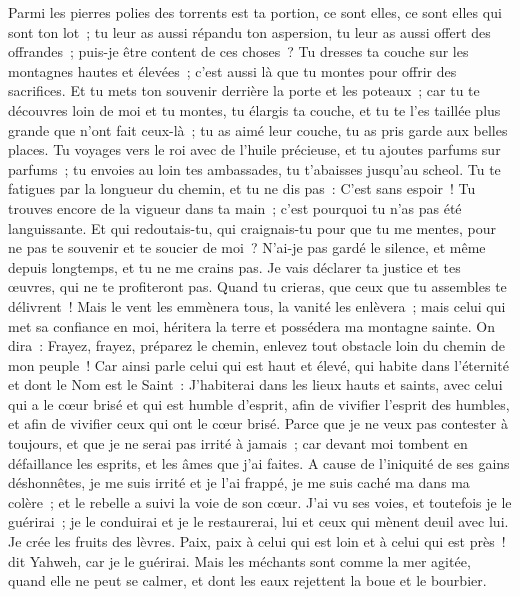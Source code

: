\begin{multicols}{2}
Parmi les pierres polies des torrents est ta portion, ce sont elles, ce sont elles qui sont ton lot~; tu leur as aussi répandu ton aspersion, tu leur as aussi offert des offrandes~; puis-je être content de ces choses~?
Tu dresses ta couche sur les montagnes hautes et élevées~; c'est aussi là que tu montes pour offrir des sacrifices.
Et tu mets ton souvenir derrière la porte et les poteaux~; car tu te découvres loin de moi et tu montes, tu élargis ta couche, et tu te l'es taillée plus grande que n'ont fait ceux-là~; tu as aimé leur couche, tu as pris garde aux belles places.
Tu voyages vers le roi avec de l'huile précieuse, et tu ajoutes parfums sur parfums~; tu envoies au loin tes ambassades, tu t'abaisses jusqu'au scheol.
Tu te fatigues par la longueur du chemin, et tu ne dis pas~: C'est sans espoir~! Tu trouves encore de la vigueur dans ta main~; c'est pourquoi tu n'as pas été languissante.
Et qui redoutais-tu, qui craignais-tu pour que tu me mentes, pour ne pas te souvenir et te soucier de moi~? N'ai-je pas gardé le silence, et même depuis longtemps, et tu ne me crains pas.
Je vais déclarer ta justice et tes œuvres, qui ne te profiteront pas.
Quand tu crieras, que ceux que tu assembles te délivrent~! Mais le vent les emmènera tous, la vanité les enlèvera~; mais celui qui met sa confiance en moi, héritera la terre et possédera ma montagne sainte.
On dira~: Frayez, frayez, préparez le chemin, enlevez tout obstacle loin du chemin de mon peuple~!
Car ainsi parle celui qui est haut et élevé, qui habite dans l'éternité et dont le Nom est le Saint~: J'habiterai dans les lieux hauts et saints, avec celui qui a le cœur brisé et qui est humble d'esprit, afin de vivifier l'esprit des humbles, et afin de vivifier ceux qui ont le cœur brisé.
Parce que je ne veux pas contester à toujours, et que je ne serai pas irrité à jamais~; car devant moi tombent en défaillance les esprits, et les âmes que j'ai faites.
A cause de l'iniquité de ses gains déshonnêtes, je me suis irrité et je l'ai frappé, je me suis caché ma dans ma colère~; et le rebelle a suivi la voie de son cœur.
J'ai vu ses voies, et toutefois je le guérirai~; je le conduirai et je le restaurerai, lui et ceux qui mènent deuil avec lui.
Je crée les fruits des lèvres. Paix, paix à celui qui est loin et à celui qui est près~! dit Yahweh, car je le guérirai.
Mais les méchants sont comme la mer agitée, quand elle ne peut se calmer, et dont les eaux rejettent la boue et le bourbier.

\end{multicols}
